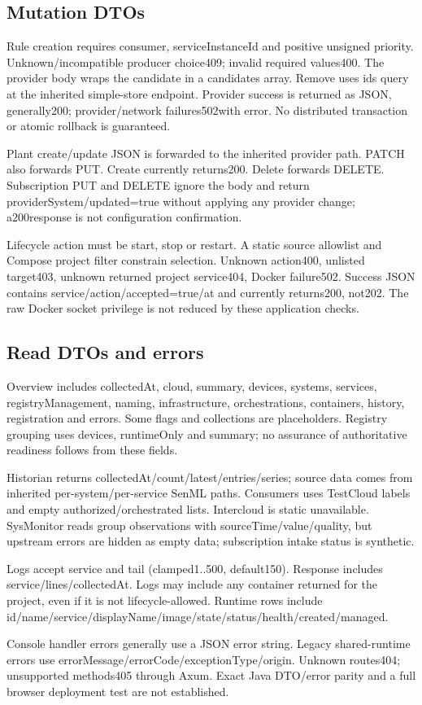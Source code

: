 \documentclass[a4paper]{arrowhead}
\begin{document}
\subsection{Mutation DTOs}
\par
Rule creation requires consumer, serviceInstanceId and positive unsigned priority. Unknown/incompatible producer choice409; invalid required values400. The provider body wraps the candidate in a candidates array. Remove uses ids query at the inherited simple-store endpoint. Provider success is returned as JSON, generally200; provider/network failures502with error. No distributed transaction or atomic rollback is guaranteed.
\par
Plant create/update JSON is forwarded to the inherited provider path. PATCH also forwards PUT. Create currently returns200. Delete forwards DELETE. Subscription PUT and DELETE ignore the body and return providerSystem/updated=true without applying any provider change; a200response is not configuration confirmation.
\par
Lifecycle action must be start, stop or restart. A static source allowlist and Compose project filter constrain selection. Unknown action400, unlisted target403, unknown returned project service404, Docker failure502. Success JSON contains service/action/accepted=true/at and currently returns200, not202. The raw Docker socket privilege is not reduced by these application checks.
\par
\subsection{Read DTOs and errors}
\par
Overview includes collectedAt, cloud, summary, devices, systems, services, registryManagement, naming, infrastructure, orchestrations, containers, history, registration and errors. Some flags and collections are placeholders. Registry grouping uses devices, runtimeOnly and summary; no assurance of authoritative readiness follows from these fields.
\par
Historian returns collectedAt/count/latest/entries/series; source data comes from inherited per-system/per-service SenML paths. Consumers uses TestCloud labels and empty authorized/orchestrated lists. Intercloud is static unavailable. SysMonitor reads group observations with sourceTime/value/quality, but upstream errors are hidden as empty data; subscription intake status is synthetic.
\par
Logs accept service and tail (clamped1..500, default150). Response includes service/lines/collectedAt. Logs may include any container returned for the project, even if it is not lifecycle-allowed. Runtime rows include id/name/service/displayName/image/state/status/health/created/managed.
\par
Console handler errors generally use a JSON error string. Legacy shared-runtime errors use errorMessage/errorCode/exceptionType/origin. Unknown routes404; unsupported methods405 through Axum. Exact Java DTO/error parity and a full browser deployment test are not established.
\end{document}
